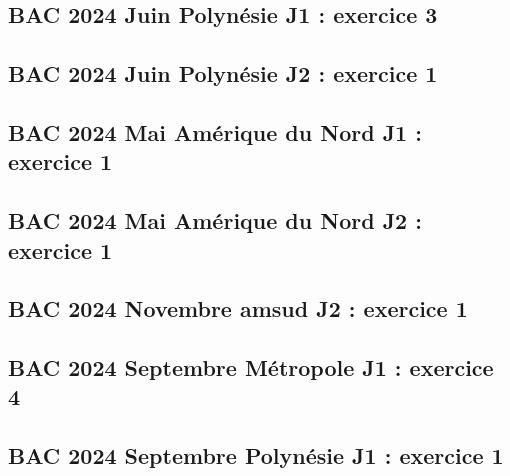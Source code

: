 \documentclass[lang=fr,edition=teacher,layout=sheet]{mxbook}
\begin{document}
\begingroup\endgroup
\par\bigskip
{}\subsection*{BAC 2024 Juin Polynésie J1 : exercice 3}
\begingroup\endgroup
\par\bigskip
{}\subsection*{BAC 2024 Juin Polynésie J2 : exercice 1}
\begingroup\endgroup
\par\bigskip
{}\subsection*{BAC 2024 Mai Amérique du Nord J1 : exercice 1}
\begingroup\endgroup
\par\bigskip
{}\subsection*{BAC 2024 Mai Amérique du Nord J2 : exercice 1}
\begingroup\endgroup
\par\bigskip
{}\subsection*{BAC 2024 Novembre amsud J2 : exercice 1}
\begingroup\endgroup
\par\bigskip
{}\subsection*{BAC 2024 Septembre Métropole J1 : exercice 4}
\begingroup\endgroup
\par\bigskip
{}\subsection*{BAC 2024 Septembre Polynésie J1 : exercice 1}
\end{document}
